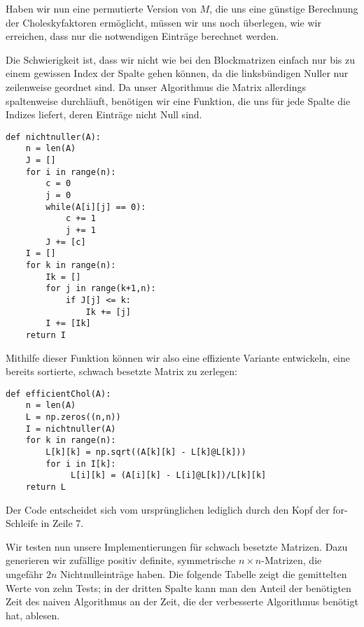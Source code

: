 Haben wir nun eine permutierte Version von $M$, die uns eine günstige Berechnung der Choleskyfaktoren ermöglicht, müssen wir uns noch überlegen, wie wir erreichen, dass nur die notwendigen Einträge berechnet werden.

Die Schwierigkeit ist, dass wir nicht wie bei den Blockmatrizen einfach nur bis zu einem gewissen Index der Spalte gehen können, da die linksbündigen Nuller nur zeilenweise geordnet sind. Da unser Algorithmus die Matrix allerdings spaltenweise durchläuft, benötigen wir eine Funktion, die uns für jede Spalte die Indizes liefert, deren Einträge nicht Null sind.

\lstset{language=Python}
\lstset{frame=lines}
\lstset{basicstyle=\footnotesize}
\begin{lstlisting}
def nichtnuller(A):
    n = len(A)
    J = []
    for i in range(n):
        c = 0
        j = 0
        while(A[i][j] == 0):
            c += 1
            j += 1
        J += [c]
    I = []
    for k in range(n):
        Ik = []
        for j in range(k+1,n):
            if J[j] <= k:
                Ik += [j]
        I += [Ik]
    return I
\end{lstlisting}


Mithilfe dieser Funktion können wir also eine effiziente Variante entwickeln, eine bereits sortierte, schwach besetzte Matrix zu zerlegen:

\lstset{language=Python}
\lstset{frame=lines}
\lstset{basicstyle=\footnotesize}
\begin{lstlisting}
def efficientChol(A):
    n = len(A)
    L = np.zeros((n,n))
    I = nichtnuller(A)
    for k in range(n):
        L[k][k] = np.sqrt((A[k][k] - L[k]@L[k]))
        for i in I[k]:
             L[i][k] = (A[i][k] - L[i]@L[k])/L[k][k]
    return L
\end{lstlisting}
Der Code entscheidet sich vom ursprünglichen lediglich durch den Kopf der for-Schleife in Zeile 7.


Wir testen nun unsere Implementierungen für schwach besetzte Matrizen. Dazu generieren wir zufällige positiv definite, symmetrische $n\times n$-Matrizen, die ungefähr $2n$ Nichtnulleinträge haben. Die folgende Tabelle zeigt die gemittelten Werte von zehn Tests; in der dritten Spalte kann man den Anteil der benötigten Zeit des naiven Algorithmus an der Zeit, die der verbesserte Algorithmus benötigt hat, ablesen.


